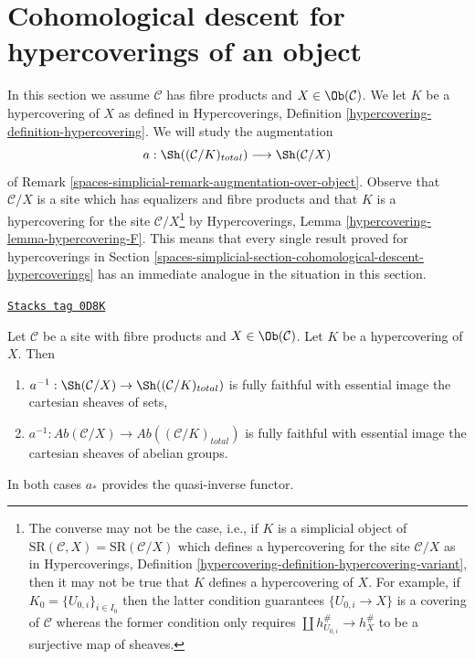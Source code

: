 \section{Cohomological descent for hypercoverings of an object}
\label{spaces-simplicial-section-cohomological-descent-hypercoverings-X}
In this section we assume $\mathcal{C}$ has fibre products
and $X \in \Ob(\mathcal{C})$. We let $K$ be a hypercovering of $X$
as defined in
Hypercoverings, Definition \ref{hypercovering-definition-hypercovering}.
We will study the augmentation
$$
a : \Sh((\mathcal{C}/K)_{total}) \longrightarrow \Sh(\mathcal{C}/X)
$$
of Remark \ref{spaces-simplicial-remark-augmentation-over-object}.
Observe that $\mathcal{C}/X$ is a site which has equalizers
and fibre products and that $K$ is a
hypercovering for the site $\mathcal{C}/X$\footnote{The converse may not
be the case, i.e., if $K$ is a simplicial object of
$\text{SR}(\mathcal{C}, X) = \text{SR}(\mathcal{C}/X)$
which defines a hypercovering for the site $\mathcal{C}/X$ as in
Hypercoverings, Definition \ref{hypercovering-definition-hypercovering-variant},
then it may not be true that $K$ defines a hypercovering of $X$.
For example, if $K_0 = \{U_{0, i}\}_{i \in I_0}$
then the latter condition guarantees
$\{U_{0, i} \to X\}$ is a covering of $\mathcal{C}$
whereas the former condition only requires
$\coprod h_{U_{0, i}}^\# \to h_X^\#$ to be a surjective map
of sheaves.} by Hypercoverings, Lemma
\ref{hypercovering-lemma-hypercovering-F}.
This means that every single result proved for hypercoverings
in Section \ref{spaces-simplicial-section-cohomological-descent-hypercoverings}
has an immediate analogue in the situation in this section.

\begin{lemma}
\label{spaces-simplicial-lemma-hypercovering-X-descent-sheaves}
\href{https://stacks.math.columbia.edu/tag/0D8K}{\texttt{Stacks tag 0D8K}}

Let $\mathcal{C}$ be a site with fibre products and $X \in \Ob(\mathcal{C})$.
Let $K$ be a hypercovering of $X$. Then
\begin{enumerate}
\item $a^{-1} : \Sh(\mathcal{C}/X) \to \Sh((\mathcal{C}/K)_{total})$
is fully faithful with essential image the cartesian sheaves of sets,
\item $a^{-1} : \textit{Ab}(\mathcal{C}/X) \to
\textit{Ab}((\mathcal{C}/K)_{total})$
is fully faithful with essential image the cartesian sheaves
of abelian groups.
\end{enumerate}
In both cases $a_*$ provides the quasi-inverse functor.
\end{lemma}

